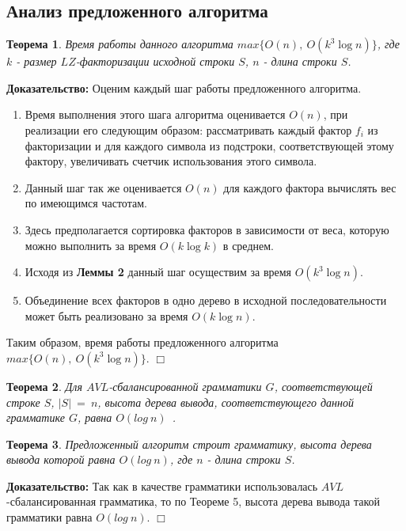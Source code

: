 \documentclass[12pt,a4paper]{extarticle}
\theoremstyle{break}
\newtheorem{theorem}{Теорема}
\begin{document}
\newpage 
\subsection{Анализ предложенного алгоритма}

\begin{theorem}
Время работы данного алгоритма $max\{O(n),\ O(k^3\log
n)\}$, где $k$ - размер $LZ$-факторизации исходной строки $S$, $n$ - длина строки $S$.
\end{theorem} 

\textbf{Доказательство:} Оценим каждый шаг работы предложенного алгоритма. 
\begin{enumerate}
  \item Время выполнения этого шага алгоритма оценивается $O(n)$, при реализации
  его следующим образом: рассматривать каждый фактор $f_i$ из факторизации и для
  каждого символа из подстроки, соответствующей этому фактору, увеличивать счетчик
  использования этого символа.
  \item Данный шаг так же оценивается $O(n)$ для каждого фактора вычислять вес
  по имеющимся частотам.
  \item Здесь предполагается сортировка факторов в зависимости от веса,
  которую можно выполнить за время $O(k\log k)$ в среднем.
  \item Исходя из \textbf{Леммы 2} данный шаг осуществим за время $O(k^3\log
  n)$.
  \item Объединение всех факторов в одно дерево в исходной последовательности
  может быть реализовано за время $O(k\log n)$.
\end{enumerate}

Таким образом, время работы предложенного алгоритма $max\{O(n),\ O(k^3\log
n)\}$.
$\Box$

\begin{theorem} 
Для $AVL$-сбалансированной грамматики $G$, соответствующей
строке $S$, $|S|\ =\ n$, высота дерева вывода, соответствующего данной
грамматике $G$, равна $O(log\ n)$~\cite{rytter}.
\end{theorem} 

\begin{theorem}
Предложенный алгоритм строит грамматику, высота дерева вывода
которой равна $O(log\ n)$, где $n$ - длина строки $S$.
\end{theorem} 

\textbf{Доказательство:} Так как в качестве грамматики использовалась
$AVL$-сбалансированная грамматика, то по Теореме 5, высота дерева вывода
такой грамматики равна $O(log\ n)$.
$\Box$
\end{document}
